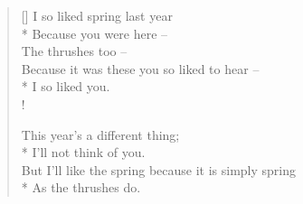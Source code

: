 \documentclass[MAIN]{subfiles}
\begin{document}
\settowidth{\versewidth}{Because it was these you so liked to hear --}
\begin{verse}[\versewidth]
I so liked spring last year\\* 
\vin Because you were here --\\
\vin \vin The thrushes too --\\
Because it was these you so liked to hear --\\*
\vin \vin I so liked you.\\!

\vin This year's a different thing;\\*
\vin \vin I'll not think of you.\\
But I'll like the spring because it is simply spring\\*
\vin \vin As the thrushes do.
\end{verse}
\end{document}
